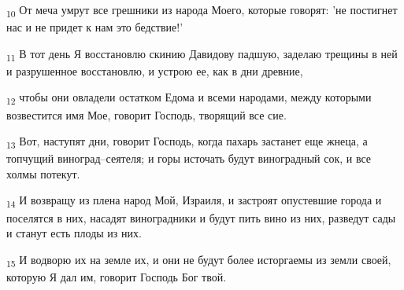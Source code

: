 \begin{tcolorbox}
\textsubscript{10} От меча умрут все грешники из народа Моего, которые говорят: 'не постигнет нас и не придет к нам это бедствие!'
\end{tcolorbox}
\begin{tcolorbox}
\textsubscript{11} В тот день Я восстановлю скинию Давидову падшую, заделаю трещины в ней и разрушенное восстановлю, и устрою ее, как в дни древние,
\end{tcolorbox}
\begin{tcolorbox}
\textsubscript{12} чтобы они овладели остатком Едома и всеми народами, между которыми возвестится имя Мое, говорит Господь, творящий все сие.
\end{tcolorbox}
\begin{tcolorbox}
\textsubscript{13} Вот, наступят дни, говорит Господь, когда пахарь застанет еще жнеца, а топчущий виноград--сеятеля; и горы источать будут виноградный сок, и все холмы потекут.
\end{tcolorbox}
\begin{tcolorbox}
\textsubscript{14} И возвращу из плена народ Мой, Израиля, и застроят опустевшие города и поселятся в них, насадят виноградники и будут пить вино из них, разведут сады и станут есть плоды из них.
\end{tcolorbox}
\begin{tcolorbox}
\textsubscript{15} И водворю их на земле их, и они не будут более исторгаемы из земли своей, которую Я дал им, говорит Господь Бог твой.
\end{tcolorbox}
